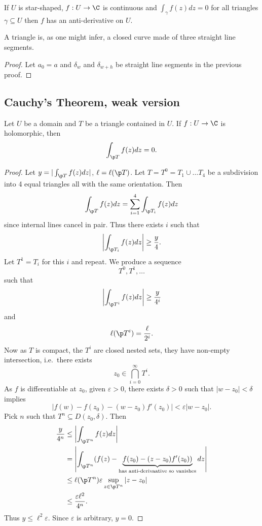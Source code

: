 \documentclass[a4paper]{article}
\begin{document}
\begin{corollary}\label{cor:anti-derivative}
  If \(U\) is star-shaped, \(f: U \to \C\) is continuous and \(\int_\gamma f(z)dz = 0\) for all triangles \(\gamma \subseteq U\) then \(f\) has an anti-derivative on \(U\).
\end{corollary}

A triangle is, as one might infer, a closed curve made of three straight line segments.

\begin{proof}
  Let \(a_0 = a\) and \(\delta_w\) and \(\delta_{w + h}\) be straight line segments in the previous proof.
\end{proof}

\subsection{Cauchy's Theorem, weak version}

\begin{theorem}
  Let \(U\) be a domain and \(T\) be a triangle contained in \(U\). If \(f: U \to \C\) is holomorphic, then
  \[
    \int_{\p T} f(z)dz = 0.
  \]
\end{theorem}

\begin{proof}
  Let \(y = |\int_{\p T} f(z)dz|\), \(\ell = \ell(\p T)\). Let \(T = T^0 = T_1 \cup \dots T_4\) be a subdivision into 4 equal triangles all with the same orientation. Then
  \[
    \int_{\p T} f(z)dz = \sum_{i = 1}^4 \int_{\p T_i} f(z)dz
  \]
  since internal lines cancel in pair. Thus there exists \(i\) such that
  \[
    \left| \int_{\p T_i} f(z)dz \right| \geq \frac{y}{4}.
  \]
  Let \(T^1 = T_i\) for this \(i\) and repeat. We produce a sequence
  \[
    T^0, T^1, \dots
  \]
  such that
  \[
    \left| \int_{\p T^i} f(z)dz \right| \geq \frac{y}{4^i}
  \]
  and
  \[
    \ell(\p T^i) = \frac{\ell}{2^i}.
  \]
  Now as \(T\) is compact, the \(T^i\) are closed nested sets, they have non-empty intersection, i.e.\ there exists
  \[
    z_0 \in \bigcap_{i = 0}^\infty T^i.
  \]
  As \(f\) is differentiable at \(z_0\), given \(\varepsilon > 0\), there exists \(\delta > 0\) such that \(|w - z_0| < \delta\) implies
  \[
    |f(w) - f(z_0) - (w - z_0) f'(z_0)| < \varepsilon |w - z_0|.
  \]
  Pick \(n\) such that \(T^n \subseteq D(z_0, \delta)\). Then
  \begin{align*}
    \frac{y}{4^n} &\leq \left| \int_{\p T^n} f(z)dz \right| \\
                  &= \left| \int_{\p T^n} (f(z) - \underbrace{f(z_0) - (z - z_0)f'(z_0))}_{\text{has anti-derivaative so vanishes}} dz \right| \\
                  &\leq \ell(\p T^n) \varepsilon \sup_{z \in \p T^n} |z - z_0| \\
                  &\leq \frac{\varepsilon \ell^2}{4^n}.
  \end{align*}
  Thus \(y \leq \ell^2 \varepsilon\). Since \(\varepsilon\) is arbitrary, \(y = 0\).
\end{proof}
\end{document}
